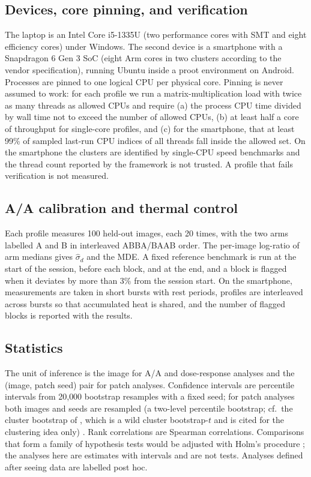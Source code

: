 \documentclass[a4paper,fleqn]{cas-dc}
\begin{document}
\subsection{Devices, core pinning, and verification}
The laptop is an Intel Core i5-1335U (two performance cores with SMT and eight efficiency cores) under Windows. The second device is a smartphone with a Snapdragon 6 Gen 3 SoC (eight Arm cores in two clusters according to the vendor specification), running Ubuntu inside a proot environment on Android. Processes are pinned to one logical CPU per physical core. Pinning is never assumed to work: for each profile we run a matrix-multiplication load with twice as many threads as allowed CPUs and require (a) the process CPU time divided by wall time not to exceed the number of allowed CPUs, (b) at least half a core of throughput for single-core profiles, and (c) for the smartphone, that at least 99\% of sampled last-run CPU indices of all threads fall inside the allowed set. On the smartphone the clusters are identified by single-CPU speed benchmarks and the thread count reported by the framework is not trusted. A profile that fails verification is not measured.

\subsection{A/A calibration and thermal control}
Each profile measures 100 held-out images, each 20 times, with the two arms labelled A and B in interleaved ABBA/BAAB order. The per-image log-ratio of arm medians gives $\hat\sigma_d$ and the MDE. A fixed reference benchmark is run at the start of the session, before each block, and at the end, and a block is flagged when it deviates by more than 3\% from the session start. On the smartphone, measurements are taken in short bursts with rest periods, profiles are interleaved across bursts so that accumulated heat is shared, and the number of flagged blocks is reported with the results.

\subsection{Statistics}
The unit of inference is the image for A/A and dose-response analyses and the (image, patch seed) pair for patch analyses. Confidence intervals are percentile intervals from 20{,}000 bootstrap resamples with a fixed seed; for patch analyses both images and seeds are resampled (a two-level percentile bootstrap; cf.\ the cluster bootstrap of \cite{cameron2008cluster}, which is a wild cluster bootstrap-$t$ and is cited for the clustering idea only) \cite{efron1979bootstrap}. Rank correlations are Spearman correlations. Comparisons that form a family of hypothesis tests would be adjusted with Holm's procedure \cite{holm1979}; the analyses here are estimates with intervals and are not tests. Analyses defined after seeing data are labelled post hoc.
\end{document}
